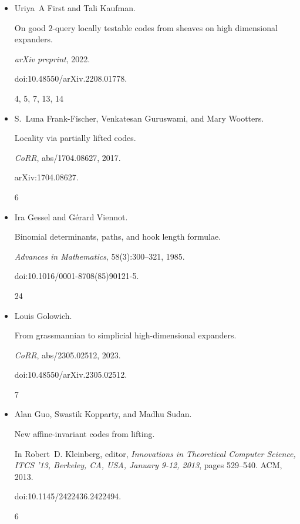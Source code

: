 \documentclass[10pt,a4paper]{article}
\begin{document}
\begin{itemize}
\item[] 
[10]

Uriya A First and Tali Kaufman.


On good $2$-query locally testable codes from sheaves on high
dimensional expanders.


\emph{arXiv preprint}, 2022.


doi:10.48550/arXiv.2208.01778.


4, 5, 7, 13, 14




\item[] 
[11]

S. Luna Frank-Fischer, Venkatesan Guruswami, and Mary Wootters.


Locality via partially lifted codes.


\emph{CoRR}, abs/1704.08627, 2017.


arXiv:1704.08627.


6




\item[] 
[12]

Ira Gessel and Gérard Viennot.


Binomial determinants, paths, and hook length formulae.


\emph{Advances in Mathematics}, 58(3):300–321, 1985.


doi:10.1016/0001-8708(85)90121-5.


24




\item[] 
[13]

Louis Golowich.


From grassmannian to simplicial high-dimensional expanders.


\emph{CoRR}, abs/2305.02512, 2023.


doi:10.48550/arXiv.2305.02512.


7




\item[] 
[14]

Alan Guo, Swastik Kopparty, and Madhu Sudan.


New affine-invariant codes from lifting.


In Robert D. Kleinberg, editor, \emph{Innovations in Theoretical
Computer Science, ITCS ’13, Berkeley, CA, USA, January 9-12, 2013}, pages
529–540. ACM, 2013.


doi:10.1145/2422436.2422494.


6





\end{itemize}
\end{document}
